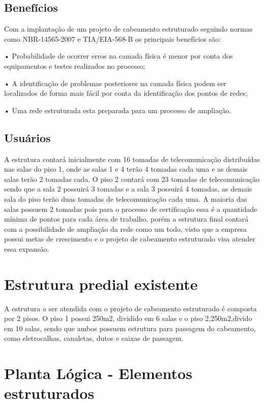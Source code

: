 \documentclass[	DIV=calc,%
							paper=a4,%
							fontsize=12pt,%
							onecolumn]{scrartcl}	 					%
\begin{document}
\subsection{Benefícios}

Com a implantação de um projeto de cabeamento estruturado seguindo normas como
NBR-14565-2007 e TIA/EIA-568-B os principais benefícios são:

 • Probabilidade de ocorrer erros na camada física é menor por conta dos equipamentos
e testes realizados no processo;

 • A identificação de problemas posteriores na camada física podem ser localizados de
forma mais fácil por conta da identificação dos pontos de redes;

 • Uma rede estruturada esta preparada para um processo de ampliação.



\subsection{Usuários}

A estrutura contará inicialmente com 16 tomadas de telecomunicação distribuídas nas
salas do piso 1, onde as salas 1 e 4 terão 4 tomadas cada uma e as demais salas terão 2
tomadas cada. O piso 2 contará com 23 tomadas de telecomunicação sendo que a sala
2 possuirá 3 tomadas e a sala 3 possuirá 4 tomadas, as demais sala do piso terão duas
tomadas de telecomunicação cada uma. A maioria das salas possuem 2 tomadas pois
para o processo de certificação essa é a quantidade mínima de pontos para cada área de
trabalho, porém a estrutura final contará com a possibilidade de ampliação da rede como
um todo, visto que a empresa possui metas de crescimento e o projeto   de cabeamento
estruturado visa atender essa expansão.



\section{Estrutura predial existente}

A estrutura a ser atendida com o projeto de cabeamento estruturado é composta por 2
pisos. O piso 1 possui 250m2, dividido em 6 salas e o piso 2,250m2,divido em 10 salas,
sendo que ambos possuem estrutura para passagem do cabeamento, como eletrocalhas,
canaletas, dutos e caixas de passagem. 


\section{Planta Lógica - Elementos estruturados}
\end{document}
